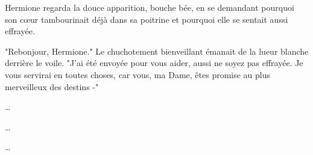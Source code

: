 Hermione regarda la douce apparition, bouche bée, en se demandant pourquoi son cœur tambourinait déjà dans sa poitrine et pourquoi elle se sentait aussi effrayée.

"Rebonjour, Hermione." Le chuchotement bienveillant émanait de la lueur blanche derrière le voile. "J'ai été envoyée pour vous aider, aussi ne soyez pas effrayée. Je vous servirai en toutes choses, car vous, ma Dame, êtes promise au plus merveilleux des destins -"

\begin{center}
…

…

…
\end{center}

